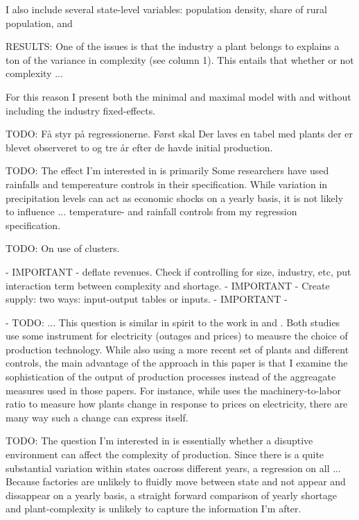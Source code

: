 \documentclass[11pt]{article}
\begin{document}
I also include several state-level variables: population density, share of rural population, and 


RESULTS: One of the issues is that the industry a plant belongs to explains a ton of the variance in complexity (see column 1). This entails that whether or not complexity ...

For this reason I present both the minimal and maximal model with and without including the industry fixed-effects.

TODO: Få styr på regressionerne. Først skal Der laves en tabel med plants der er blevet observeret to og tre år efter de havde initial production.

TODO: The effect I'm interested in is primarily 
Some researchers have used rainfalls and tempereature controls in their specification. While variation in precipitation levels can act as economic shocks on a yearly basis, it is not likely to influence ... 
temperature- and rainfall controls from my regression specification.


TODO: On use of clusters. 

 - IMPORTANT - deflate revenues. Check if controlling for size, industry, etc, put interaction term between complexity and shortage.
 - IMPORTANT - Create supply: two ways: input-output tables or inputs. 
 - IMPORTANT - 

- TODO: ... This question is similar in spirit to the work in \cite{allcott_how_2016} and \cite{abeberese_electricity_2017}. Both studies use some instrument for electricity (outages and prices) to meausre the choice of production technology. While also using a more recent set of plants and different controls, the main advantage of the approach in this paper is that I examine the sophistication of the output of production processes instead of the aggreagate measures used in those papers. For instance, while \cite{abeberese_electricity_2017} uses the machinery-to-labor ratio to measure how plants change in response to prices on electricity, there are many way such a change can express itself. 

TODO: The question I'm interested in is essentially whether a disuptive environment can affect the complexity of production. Since there is a quite substantial variation within states oacross different years, a regression on all ... Because factories are unlikely to fluidly move between state and not appear and dissappear on a yearly basis, a straight forward comparison of yearly shortage and plant-complexity is unlikely to capture the information I'm after.
\end{document}
